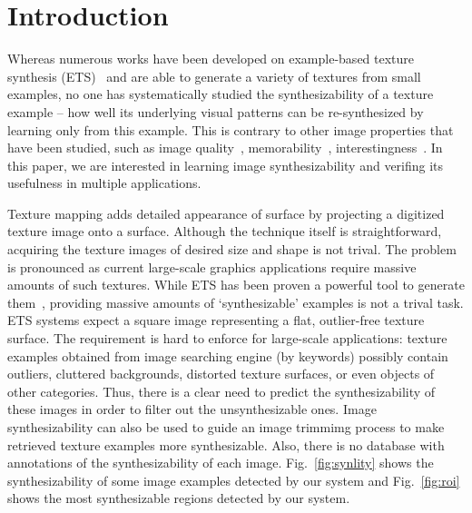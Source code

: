 \section{Introduction}

Whereas numerous works have been developed on example-based texture
synthesis (ETS)~\cite{Heeger:95, Portilla:2000:IJCV,
  Efros:sig2001,Kwatra:2003, Lefebvre:2005:sig, Ma:2011,
  dai:facade:iccv13} and are able to generate a variety of textures
from small examples, no one has systematically studied the
synthesizability of a texture example -- how well its underlying
visual patterns can be re-synthesized by learning only from this
example. This is contrary to other image properties that have been
studied, such as image quality~\cite{image:quality},
memorability~\cite{image:memorability},
interestingness~\cite{image:interestingness}. In this paper, we are
interested in learning image synthesizability and verifing its
usefulness in multiple applications.

Texture mapping adds detailed appearance of surface by projecting a
digitized texture image onto a surface. Although the technique itself
is straightforward, acquiring the texture images of desired size and
shape is not trival. The problem is pronounced as current large-scale
graphics applications require massive amounts of such textures. While
ETS has been proven a powerful tool to generate them~\cite{WLKT09},
providing massive amounts of `synthesizable' examples is not a trival
task. ETS systems expect a square image representing a flat,
outlier-free texture surface. 
The requirement is hard to enforce for large-scale applications:
texture examples obtained from image searching engine (by keywords)
possibly contain outliers, cluttered backgrounds, distorted texture
surfaces, or even objects of other categories. Thus, there is a clear
need to predict the synthesizability of these images in order to
filter out the unsynthesizable ones. Image synthesizability can also
be used to guide an image trimmimg process to make retrieved texture
examples more synthesizable. Also, there is no database with
annotations of the synthesizability of each image.
Fig.~\ref{fig:synlity} shows the synthesizability of some image
examples detected by our system and Fig.~\ref{fig:roi} shows the most
synthesizable regions detected by our system.

